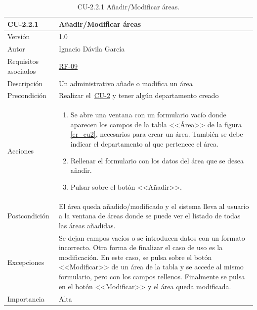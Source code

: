 \begin{table}[p]
	\centering
	\begin{tabularx}{\linewidth}{ p{} p{} }
		\toprule
		\textbf{CU-2.2.1}    & \textbf{Añadir/Modificar áreas}\\
		\toprule
		{\small Versión}              & 1.0    \\
		{\small Autor}                & Ignacio Dávila García \\
		{\small Requisitos asociados} & \hyperref[itm:RF9]{RF-09} \\
		{\small Descripción}          & Un administrativo añade o modifica un área \\
		{\small Precondición}         & Realizar el~\hyperref[table:CU-2]{CU-2} y tener algún departamento creado \\
		{\small Acciones}             &
		\begin{enumerate}
			\def\labelenumi{\arabic{enumi}.}
			\tightlist
			\item Se abre una ventana con un formulario vacío donde aparecen los campos de la tabla <<Área>> de la figura \ref{er_cu2}, necesarios para crear un área. También se debe indicar el departamento al que pertenece el área.
			\item Rellenar el formulario con los datos del área que se desea añadir.
			\item Pulsar sobre el botón <<Añadir>>.
		\end{enumerate}\\
		{\small Postcondición}        & El área queda añadido/modificado y el sistema lleva al usuario a la ventana de áreas donde se puede ver el listado de todas las áreas añadidas. \\
		{\small Excepciones}          & Se dejan campos vacíos o se introducen datos con un formato incorrecto. Otra forma de finalizar el caso de uso es la modificación. En este caso, se pulsa sobre el botón <<Modificar>> de un área de la tabla y se accede al mismo formulario, pero con los campos rellenos. Finalmente se pulsa en el botón <<Modificar>> y el área queda modificada. \\
		{\small Importancia}          & Alta \\
		\bottomrule
	\end{tabularx}
	\caption{CU-2.2.1 Añadir/Modificar áreas.}\label{table:CU-2_2_1}
\end{table}
\FloatBarrier

